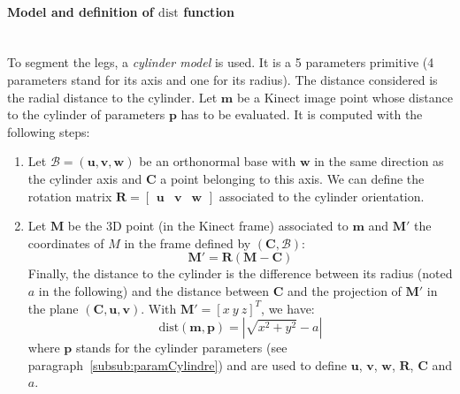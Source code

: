 \documentclass[letterpaper, 10 pt, conference]{ieeeconf}
\newcommand{\CDOK}[2]{{#1}} %
\begin{document}
\paragraph{Model and definition of $\mathrm{dist}$ function}~\\
\label{paragraph:paramCylindre}
To segment the legs, a \emph{cylinder model} is used. It is a 5 parameters primitive (4 parameters stand for its axis and one for its radius). The distance considered is the radial distance to the cylinder.  Let $\mathbf{m}$ be a Kinect image point whose distance to the cylinder of parameters $\mathbf{p}$ has to be evaluated. It is computed with the following steps:
\begin{enumerate}
	\item Let $\mathcal{B}=(\mathbf{u},\mathbf{v},\mathbf{w})$ be an orthonormal base with $\mathbf{w}$ in the same direction \CDOK{as}{than} the cylinder axis and  $\mathbf{C}$ a point belonging to this axis. \CDOK{We can define the rotation matrix $\mathbf{R} = \begin{bmatrix}\mathbf{u} & \mathbf{v} & \mathbf{w}\end{bmatrix}$ associated to the cylinder orientation.}{The rotation matrix $\mathbf{R}$  $(\mathbf{x},\mathbf{y},\mathbf{z})$ initiale à $\mathcal{B}$:
	\begin{equation}
		\mathbf{R} = 
		\begin{bmatrix}
			\mathbf{u} & \mathbf{v} & \mathbf{w}
		\end{bmatrix}
	\end{equation}}
	\item Let $\mathbf{M}$ be the 3D point (in the Kinect frame) associated to $\mathbf{m}$ and $\mathbf{M}'$ the coordinates of $M$ in the frame defined by $(\mathbf{C},\mathcal{B})$:
	\begin{equation}
		\mathbf{M}' = \mathbf{R}\left(\mathbf{M}-\mathbf{C}\right)
	\end{equation}
	Finally, the distance to the cylinder is the difference between its radius (noted $a$ in the following) and the distance between $\mathbf{C}$ and the projection of $\mathbf{M}'$ in the plane $(\mathbf{C},\mathbf{u},\mathbf{v})$. With $\mathbf{M}'=[x\ y\ z]^T$, we have:
	\begin{equation}
		\mathrm{dist}(\mathbf{m},\mathbf{p}) = |\sqrt{x^2+y^2} - a|
	\end{equation}
	where $\mathbf{p}$ stands for the cylinder parameters (see paragraph~\ref{subsub:paramCylindre}) and are used to define $\mathbf{u}$, $\mathbf{v}$, $\mathbf{w}$, $\mathbf{R}$, $\mathbf{C}$ and $a$.
\end{enumerate}
\end{document}
